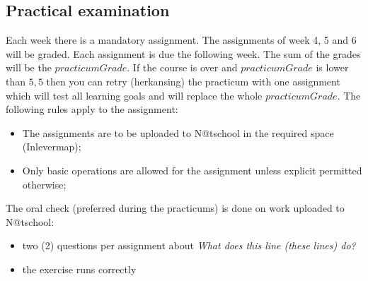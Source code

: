 \subsection{Practical examination \modulecode}
Each week there is a mandatory assignment. The assignments of week 4, 5 and 6 will be graded. Each assignment is due the following week. The sum of the grades will be the $practicumGrade$. 
If the course is over and $practicumGrade$ is lower than $5,5$ then you can retry (herkansing) the practicum with one assignment which will test all learning goals and will replace the whole $practicumGrade$.
The following rules apply to the assignment:
\begin{itemize}
  \item The assignments are to be uploaded to N@tschool in the required space (Inlevermap);
  \item Only basic operations are allowed for the assignment unless explicit permitted otherwise; 
\end{itemize}
The oral check  (preferred during the practicums) is done on work uploaded to N@tschool:
\begin{itemize}
  \item two (2) questions per assignment about \textit{What does this line (these lines) do?}
  \item the exercise runs correctly
\end{itemize}

